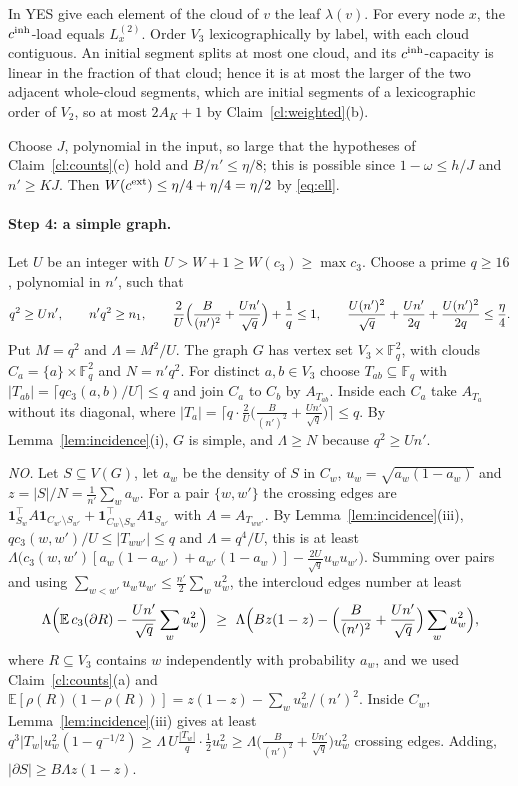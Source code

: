 \documentclass[11pt,letterpaper]{article}
\theoremstyle{definition}
\theoremstyle{remark}
\newcommand{\F}{\mathbb F}
\newcommand{\E}{\mathbb E}
\newcommand{\ind}{\mathbf 1}
\begin{document}
In YES give each element of the cloud of \(v\) the leaf \(\lambda(v)\). For
every node \(x\), the \(c^{\rm inh}\)-load equals \(L^{(2)}_x\). Order
\(V_3\) lexicographically by label, with each cloud contiguous. An initial
segment splits at most one cloud, and its \(c^{\rm inh}\)-capacity is
linear in the fraction of that cloud; hence it is at most the larger of the
two adjacent whole-cloud segments, which are initial segments of a
lexicographic order of \(V_2\), so at most \(2A_K+1\) by
Claim~\ref{cl:weighted}(b).

Choose \(J\), polynomial in the input, so large that the hypotheses of
Claim~\ref{cl:counts}(c) hold and \(B/n'\le\eta/8\); this is possible since
\(1-\omega\le h/J\) and \(n'\ge KJ\). Then
\(W(c^{\rm ext})\le\eta/4+\eta/4=\eta/2\) by \eqref{eq:ell}.

\paragraph{Step 4: a simple graph.}
Let \(U\) be an integer with \(U>W+1\ge W(c_3)\ge\max c_3\). Choose a prime
\(q\ge16\), polynomial in \(n'\), such that
\[
q^2\ge Un',\qquad n'q^2\ge n_1,\qquad
\frac2U\Bigl(\frac{B}{(n')^2}+\frac{Un'}{\sqrt q}\Bigr)+\frac1q\le1,\qquad
\frac{U(n')^2}{\sqrt q}+\frac{Un'}{2q}+\frac{U(n')^2}{2q}\le\frac\eta4 .
\]
Put \(M=q^2\) and \(\Lambda=M^2/U\). The graph \(G\) has vertex set
\(V_3\times\F_q^2\), with clouds \(C_a=\{a\}\times\F_q^2\) and \(N=n'q^2\).
For distinct \(a,b\in V_3\) choose \(T_{ab}\subseteq\F_q\) with
\(|T_{ab}|=\lceil qc_3(a,b)/U\rceil\le q\) and join \(C_a\) to \(C_b\) by
\(A_{T_{ab}}\). Inside each \(C_a\) take \(A_{T_a}\) without its diagonal,
where \(|T_a|=\bigl\lceil q\cdot\frac2U\bigl(\frac{B}{(n')^2}+\frac{Un'}{\sqrt
q}\bigr)\bigr\rceil\le q\). By Lemma~\ref{lem:incidence}(i), \(G\) is simple,
and \(\Lambda\ge N\) because \(q^2\ge Un'\).

\emph{NO.} Let \(S\subseteq V(G)\), let \(a_w\) be the density of \(S\) in
\(C_w\), \(u_w=\sqrt{a_w(1-a_w)}\) and \(z=|S|/N=\frac1{n'}\sum_wa_w\). For a
pair \(\{w,w'\}\) the crossing edges are
\(\ind_{S_w}^{\top}A\ind_{C_{w'}\setminus S_{w'}}+\ind_{C_w\setminus
S_w}^{\top}A\ind_{S_{w'}}\) with \(A=A_{T_{ww'}}\). By
Lemma~\ref{lem:incidence}(iii), \(qc_3(w,w')/U\le|T_{ww'}|\le q\) and
\(\Lambda=q^4/U\), this is at least
\(\Lambda\bigl(c_3(w,w')[a_w(1-a_{w'})+a_{w'}(1-a_w)]-\frac{2U}{\sqrt q}u_wu_{w'}\bigr)\).
Summing over pairs and using \(\sum_{w<w'}u_wu_{w'}\le\frac{n'}2\sum_wu_w^2\),
the intercloud edges number at least
\[
\Lambda\Bigl(\E\,c_3(\partial R)-\frac{Un'}{\sqrt q}\sum_wu_w^2\Bigr)
\ \ge\ \Lambda\Bigl(Bz(1-z)-\Bigl(\frac{B}{(n')^2}+\frac{Un'}{\sqrt q}\Bigr)\sum_wu_w^2\Bigr),
\]
where \(R\subseteq V_3\) contains \(w\) independently with probability
\(a_w\), and we used Claim~\ref{cl:counts}(a) and
\(\E[\rho(R)(1-\rho(R))]=z(1-z)-\sum_wu_w^2/(n')^2\). Inside \(C_w\),
Lemma~\ref{lem:incidence}(iii) gives at least
\(q^3|T_w|u_w^2(1-q^{-1/2})\ge\Lambda\,U\frac{|T_w|}{q}\cdot\frac12u_w^2
\ge\Lambda\bigl(\frac{B}{(n')^2}+\frac{Un'}{\sqrt q}\bigr)u_w^2\) crossing
edges. Adding, \(|\partial S|\ge B\Lambda z(1-z)\).
\end{document}

